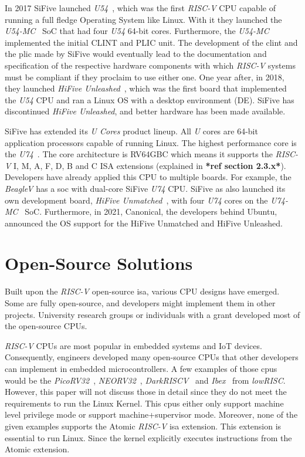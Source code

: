 In 2017 SiFive launched \textit{U54}~\cite{u54}, which was the first \textit{RISC-V} CPU capable of running a full fledge Operating System like Linux. With it they launched the \textit{U54-MC}~\cite{u54-mc} SoC that had four \textit{U54} 64-bit cores. Furthermore, the \textit{U54-MC} implemented the initial CLINT and PLIC unit. The development of the \acrshort{clint} and the \acrshort{plic} made by SiFive would eventually lead to the documentation and specification of the respective hardware components with which \textit{RISC-V} systems must be compliant if they proclaim to use either one. One year after, in 2018, they launched \textit{HiFive Unleashed}~\cite{hifive_unleashed}, which was the first board that implemented the \textit{U54} CPU and ran a Linux OS with a desktop environment (DE). SiFive has discontinued \textit{HiFive Unleashed}, and better hardware has been made available.

SiFive has extended its \textit{U Cores} product lineup. All \textit{U} cores are 64-bit application processors capable of running Linux. The highest performance core is the \textit{U74}~\cite{u74}. The core architecture is RV64GBC which means it supports the \textit{RISC-V} I, M, A, F, D, B and C ISA extensions (explained in \textbf{*ref section 2.3.x*}). Developers have already applied this CPU to multiple boards. For example, the \textit{BeagleV} has a \acrshort{soc} with dual-core SiFive \textit{U74} CPU. SiFive as also launched its own development board, \textit{HiFive Unmatched}~\cite{hifive_unmatched}, with four \textit{U74} cores on the \textit{U74-MC}~\cite{u74-mc} SoC. Furthermore, in 2021, Canonical, the developers behind Ubuntu, announced the OS support for the HiFive Unmatched and HiFive Unleashed.

\section{Open-Source Solutions}
\label{section:open_source_solutions}
Built upon the \textit{RISC-V} open-source \acrlong{isa}, various CPU designs have emerged. Some are fully open-source, and developers might implement them in other projects. University research groups or individuals with a grant developed most of the open-source CPUs.

\textit{RISC-V} CPUs are most popular in embedded systems and IoT devices. Consequently, engineers developed many open-source CPUs that other developers can implement in embedded microcontrollers. A few examples of those \acrshort{cpu}s would be the \textit{PicoRV32}~\cite{picorv32}, \textit{NEORV32}~\cite{neorv32}, \textit{DarkRISCV}~\cite{darkriscv} and \textit{Ibex}~\cite{ibex} from \textit{lowRISC}. However, this paper will not discuss those in detail since they do not meet the requirements to run the Linux Kernel. This \acrshort{cpu}s either only support \acrfull{machine} level privilege mode or support \acrfull{machine}+\acrfull{supervisor} mode. Moreover, none of the given examples supports the Atomic \textit{RISC-V} \acrshort{isa} extension. This extension is essential to run Linux. Since the kernel explicitly executes instructions from the Atomic extension.


